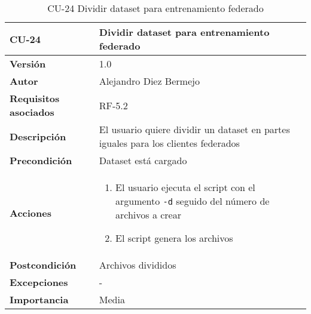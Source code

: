 \begin{table}[p]
	\centering
	\begin{tabularx}{\linewidth}{ p{} p{} }
		\toprule
		\textbf{CU-24}    & \textbf{Dividir dataset para entrenamiento federado}\\
		\toprule
		\textbf{Versión}              & 1.0    \\
		\textbf{Autor}                & Alejandro Diez Bermejo \\
		\textbf{Requisitos asociados} & RF-5.2 \\
		\textbf{Descripción}          & El usuario quiere dividir un dataset en partes iguales para los clientes federados \\
        \textbf{Precondición}         & Dataset está cargado \\
		\textbf{Acciones}             &
		\begin{enumerate}
			\def\labelenumi{\arabic{enumi}.}
			\tightlist
            \item El usuario ejecuta el script con el argumento \texttt{-d} seguido del número de archivos a crear
            \item El script genera los archivos
		\end{enumerate}\\
		\textbf{Postcondición}        & Archivos divididos \\
		\textbf{Excepciones}          & - \\
		\textbf{Importancia}          & Media \\
		\bottomrule
	\end{tabularx}
	\caption{CU-24 Dividir dataset para entrenamiento federado}
\end{table}

